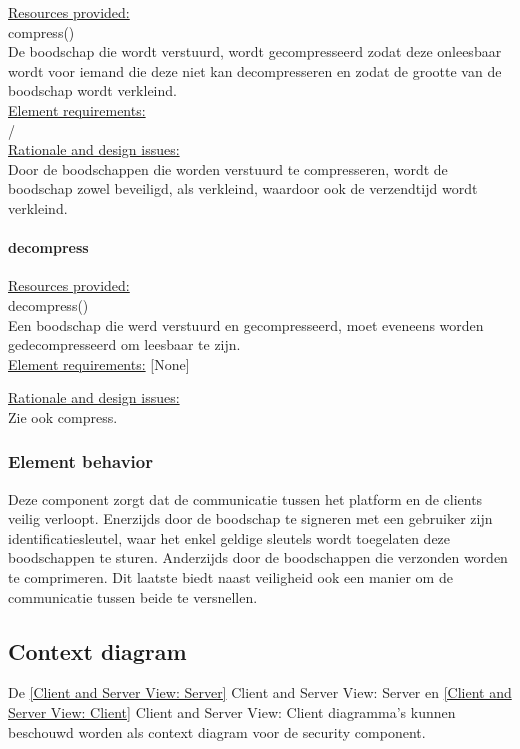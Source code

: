 \documentclass[a4paper,10pt]{article}
\begin{document}
\underline{Resources provided:}\\
compress()\\
De boodschap die wordt verstuurd, wordt gecompresseerd zodat deze onleesbaar wordt voor iemand die deze niet kan decompresseren en zodat de grootte van de boodschap wordt verkleind.\\

\underline{Element requirements:}\\
/\\

\underline{Rationale and design issues:}\\
Door de boodschappen die worden verstuurd te compresseren, wordt de boodschap zowel beveiligd, als verkleind, waardoor ook de verzendtijd wordt verkleind.\\

\paragraph{decompress}

\underline{Resources provided:}\\
decompress()\\
Een boodschap die werd verstuurd en gecompresseerd, moet eveneens worden gedecompresseerd om leesbaar te zijn.\\

\underline{Element requirements:}
[None]

\underline{Rationale and design issues:}\\
Zie ook compress.\\

\subsubsection{Element behavior}
Deze component zorgt dat de communicatie tussen het platform en de clients veilig verloopt. Enerzijds door de boodschap te signeren met een gebruiker zijn identificatiesleutel, waar het enkel geldige sleutels wordt toegelaten deze boodschappen te sturen. Anderzijds door de boodschappen die verzonden worden te comprimeren. Dit laatste biedt naast veiligheid ook een manier om de communicatie tussen beide te versnellen.\\

\subsection{Context diagram}
De \ref{Client and Server View: Server} Client and Server View: Server en \ref{Client and Server View: Client} Client and Server View: Client diagramma's kunnen beschouwd worden als context diagram voor de security component.
\end{document}
